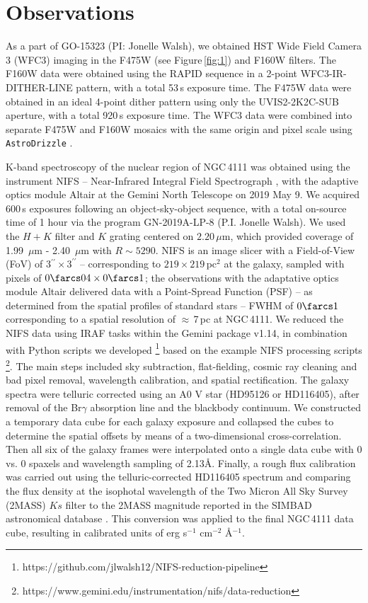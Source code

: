 \documentclass[fleqn,usenatbib]{mnras}
\begin{document}
 
\section{Observations}

As a part of GO-15323 (PI: Jonelle Walsh), we obtained HST Wide Field Camera 3 (WFC3) imaging in the F475W (see Figure\,\ref{fig:1}) and F160W filters. The F160W data were obtained using the RAPID sequence in a 2-point WFC3-IR-DITHER-LINE pattern, with a total 53\,s exposure time. The F475W data were obtained in an ideal 4-point dither pattern using only the UVIS2-2K2C-SUB aperture, with a total 920\,s exposure time. The WFC3 data were combined into separate F475W and F160W mosaics with the same origin and pixel scale using {\tt AstroDrizzle} \citep{gonzaga_drizzlepac_2012}.

K-band spectroscopy of the nuclear region of NGC\,4111 was obtained using the instrument NIFS -- Near-Infrared Integral Field Spectrograph \citep{mcgregor_gemini_2003}, with the adaptive optics module Altair \citep{herriot_progress_2000, boccas_laser_2006} at the Gemini North Telescope on 2019 May 9. We acquired 600\,s exposures following an object-sky-object sequence, with a total on-source time of 1 hour via the program GN-2019A-LP-8 (P.I. Jonelle Walsh). We used the $H+K$ filter and $K$ grating centered on $2.20\,\mu$m, which provided coverage of 1.99 $\,\mu$m - 2.40 $\,\mu$m with $R \sim 5290$. NIFS is an image slicer with a Field-of-View (FoV) of 3$^{\prime\prime}\times3^{\prime\prime}$ -- corresponding to $219\times219$\,pc$^2$ at the galaxy, sampled with pixels of $0\farcs04\times0\farcs1$; the observations with the adaptative optics module Altair delivered data with a Point-Spread Function (PSF) -- as determined from the spatial profiles of standard stars --  FWHM of $0\farcs1$ corresponding to a spatial resolution of $\approx$\,7\,pc at NGC\,4111. We reduced the NIFS data using IRAF tasks \citep{tody_iraf_1986, tody_iraf_1993} within the Gemini package v1.14, in combination with Python scripts we developed \footnote{https://github.com/jlwalsh12/NIFS-reduction-pipeline} based on the example NIFS processing scripts \footnote{https://www.gemini.edu/instrumentation/nifs/data-reduction}. The main steps included sky subtraction, flat-fielding, cosmic ray cleaning and bad pixel removal, wavelength calibration, and spatial rectification. The galaxy spectra were telluric corrected using an A0 V star (HD95126 or HD116405), after removal of the Br$\gamma$ absorption line and the blackbody continuum. We constructed a temporary data cube for each galaxy exposure and collapsed the cubes to determine the spatial offsets by means of a two-dimensional cross-correlation. Then all six of the galaxy frames were interpolated onto a single data cube with 0 vs. 0 spaxels and wavelength sampling of 2.13\AA. Finally, a rough flux calibration was carried out using the telluric-corrected HD116405 spectrum and comparing the flux density at the isophotal wavelength of the Two Micron All Sky Survey (2MASS) $Ks$ filter to the 2MASS magnitude reported in the SIMBAD astronomical database \citep{wenger_simbad_2000}. This conversion was applied to the final NGC\,4111 data cube, resulting in calibrated units of erg s$^{-1}$ cm$^{-2}$ \AA$^{-1}$. 
\end{document}
